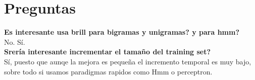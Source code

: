 \documentclass[11pt,a4paper]{report}
\begin{document}
	\section*{Preguntas}
	
	\textbf{Es interesante usa brill para bigramas y unigramas? y para hmm?}\\
	No. Sí.\\
	
	
	\textbf{Srería interesante incrementar el tamaño del training set?}\\
	Sí, puesto que aunqe la mejora es pequeña el incremento temporal es muy bajo, sobre todo si usamos paradigmas rapidos como Hmm o perceptron.
    	
    	
\end{document}
